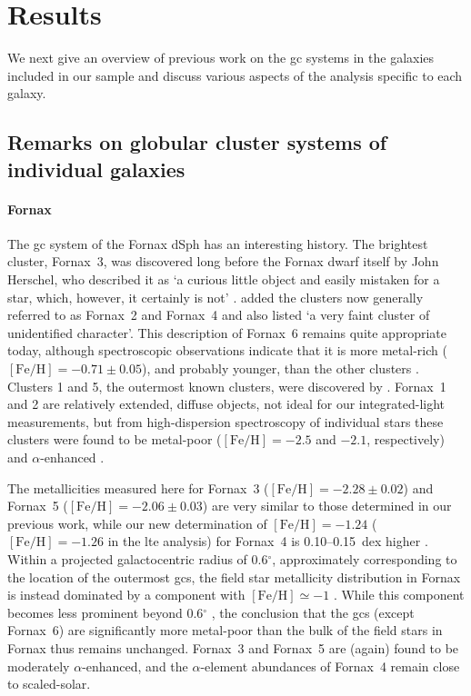 \documentclass{aa}
\begin{document}
\section{Results}

We next give an overview of previous work on the \ac{gc} systems in the galaxies included in our sample and discuss various aspects of the analysis specific to each galaxy. 

\subsection{Remarks on globular cluster systems of individual galaxies}
\label{sec:individual_remarks}


\paragraph{Fornax}

The \ac{gc} system of the Fornax dSph has an interesting history. 
The brightest cluster, Fornax~3, was discovered long before the Fornax dwarf itself by John Herschel, who described it as `a curious little object and easily mistaken for a star, which, however, it certainly is not' \citep{Herschel1847}. \citet{Shapley1939} added the clusters now generally referred to as Fornax~2 and Fornax~4 and also listed  `a very faint cluster of unidentified character'. This description of Fornax~6 remains quite appropriate today, although spectroscopic observations indicate that it is more metal-rich ($\mathrm{[Fe/H]}=-0.71\pm0.05$), and probably younger, than the other clusters \citep{Pace2021}. Clusters 1 and 5, the outermost known clusters, were discovered by \citet{Hodge1961}. Fornax~1 and 2 are relatively extended, diffuse objects, not ideal for our integrated-light measurements, but from high-dispersion spectroscopy of individual stars these clusters were found to be metal-poor ($\mathrm{[Fe/H]}=-2.5$ and $-2.1$, respectively) and $\alpha$-enhanced \citep{Letarte2006}.

The metallicities measured here for Fornax~3 ($\mathrm{[Fe/H]}=-2.28\pm0.02$) and Fornax~5 ($\mathrm{[Fe/H]}=-2.06\pm0.03$) are very similar to those determined in our previous work, while our new determination of $\mathrm{[Fe/H]}=-1.24$ ($\mathrm{[Fe/H]}=-1.26$ in the \ac{lte} analysis) for Fornax~4 is 0.10--0.15~dex higher  \citep{Larsen2012a,Larsen2018}. 
Within a projected galactocentric radius of 0.6$^\circ$, approximately corresponding to the location of the outermost \acp{gc}, the field star metallicity distribution in Fornax is instead dominated by a component with $\mathrm{[Fe/H]}\simeq-1$ \citep{Battaglia2006,Kirby2011a}.
While this component becomes less prominent beyond 0.6$^\circ$ \citep{Hendricks2014}, the conclusion that the \acp{gc} (except Fornax~6) are significantly more metal-poor than the bulk of the field stars in Fornax thus remains unchanged. 
Fornax~3 and Fornax~5 are (again) found to be moderately $\alpha$-enhanced, and the $\alpha$-element abundances of Fornax~4 remain close to scaled-solar.
\end{document}
